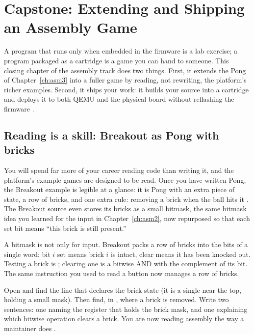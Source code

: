 \chapter{Capstone: Extending and Shipping an Assembly Game}
\label{ch:asmcap}

A program that runs only when embedded in the firmware is a lab exercise; a
program packaged as a cartridge is a game you can hand to someone. This closing
chapter of the assembly track does two things. First, it extends the Pong of
Chapter~\ref{ch:asm3} into a fuller game by reading, not rewriting, the
platform's richer examples. Second, it ships your work: it builds your source
into a  cartridge and deploys it to both QEMU and the physical
board without reflashing the firmware \citep{prg32tutorial,prg32cartfmt}.

\section{Reading is a skill: Breakout as Pong with bricks}

You will spend far more of your career reading code than writing it, and the
platform's example games are designed to be read. Once you have written Pong, the
Breakout example is legible at a glance: it is Pong with an extra piece of
state, a row of bricks, and one extra rule: removing a brick when the ball hits
it \citep{prg32repo}. The Breakout source even stores its bricks as a small bitmask,
the same bitmask idea you learned for the input in Chapter~\ref{ch:asm2}, now
repurposed so that each set bit means ``this brick is still present.''

\begin{prgconcept}
A bitmask is not only for input. Breakout packs a row of bricks into the bits of a
single word: bit $i$ set means brick $i$ is intact, clear means it has been
knocked out. Testing a brick is ; clearing one is a bitwise AND with
the complement of its bit. The same instruction you used to read a button now
manages a row of bricks.
\end{prgconcept}

\begin{prgtry}
Open  and find the line that
declares the brick state (it is a single  near the top, holding a
small mask). Then find, in , where a brick is removed. Write two
sentences: one naming the register that holds the brick mask, and one explaining
which bitwise operation clears a brick. You are now reading assembly the way a
maintainer does \citep{prg32repo}.
\end{prgtry}

